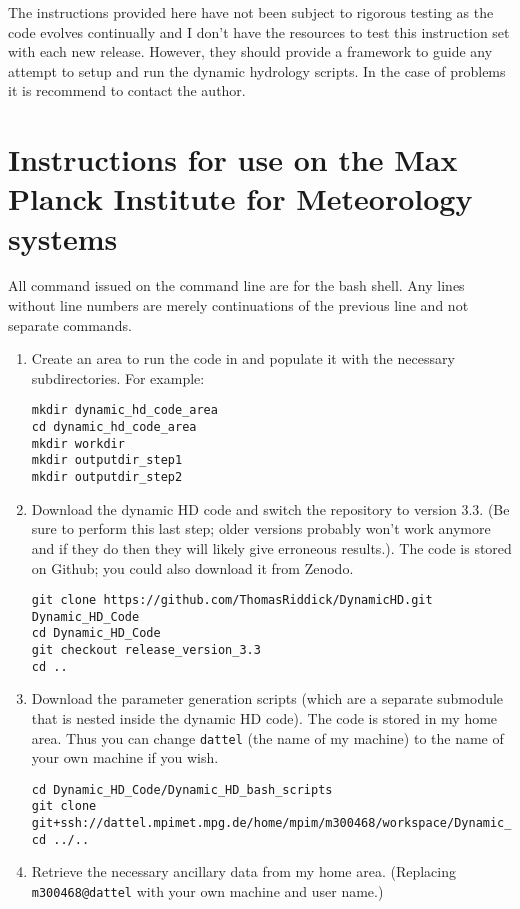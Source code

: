 \documentclass{article}
\begin{document}
The instructions provided here have not been subject to rigorous testing as the code evolves continually and I don't have the resources to test this instruction set with each new release. However, they should provide a framework to guide any attempt to setup and run the dynamic hydrology scripts. In the case of problems it is recommend to contact the author.
\section{Instructions for use on the Max Planck Institute for Meteorology systems} \label{section-max-planck-instructions}
All command issued on the command line are for the bash shell. Any lines without line numbers are merely continuations of the previous line and not separate commands.
\begin{enumerate}
\item Create an area to run the code in and populate it with the necessary subdirectories. For example:
\begin{lstlisting}[style=bash_input]
mkdir dynamic_hd_code_area
cd dynamic_hd_code_area
mkdir workdir
mkdir outputdir_step1
mkdir outputdir_step2
\end{lstlisting}
\item Download the dynamic HD code and switch the repository to version 3.3. (Be sure to perform this last step; older versions probably won't work anymore and if they do then they will likely give erroneous results.). The code is stored on Github; you could also download it from Zenodo.
\begin{lstlisting}[style=bash_input,breaklines=true]
git clone https://github.com/ThomasRiddick/DynamicHD.git Dynamic_HD_Code
cd Dynamic_HD_Code
git checkout release_version_3.3
cd ..
\end{lstlisting}
\item Download the parameter generation scripts (which are a separate submodule that is nested inside the dynamic HD code). The code is stored in my home area. Thus you can change  \lstinline[style=bash_input]{dattel} (the name of my machine) to the name of your own machine if you wish.
\begin{lstlisting}[style=bash_input,breaklines=true]
cd Dynamic_HD_Code/Dynamic_HD_bash_scripts
git clone git+ssh://dattel.mpimet.mpg.de/home/mpim/m300468/workspace/Dynamic_HD_Code/Dynamic_HD_bash_scripts/parameter_generation_scripts
cd ../..
\end{lstlisting}
\item Retrieve the necessary ancillary data from my home area. (Replacing \lstinline[style=bash_input]{m300468@dattel} with your own machine and user name.)

\end{enumerate}
\end{document}
